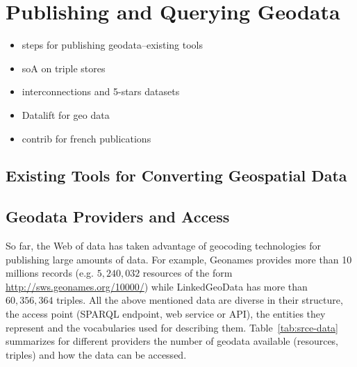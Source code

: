 
\chapter{Publishing and Querying Geodata }
\label{ch:ch2}

\begin{itemize}
\item steps for publishing geodata--existing tools
\item soA on triple stores 
\item interconnections and 5-stars datasets
\item Datalift for geo data
\item contrib for french publications
\end{itemize}

\section{Existing Tools for Converting Geospatial Data}
\label{sec:toolgeo}



\section{Geodata Providers and Access}
So far, the Web of data has taken advantage of geocoding technologies for publishing large amounts of data. For example, Geonames provides more than 10 millions records (e.g. $5,240,032$ resources of the form \url{http://sws.geonames.org/10000/}) while LinkedGeoData has more than $60,356,364$ triples. All the above mentioned data are diverse in their structure, the access point (SPARQL endpoint, web service or API), the entities they represent and the vocabularies used for describing them. Table~\ref{tab:srce-data} summarizes for different providers the number of geodata available (resources, triples) and how the data can be accessed.

